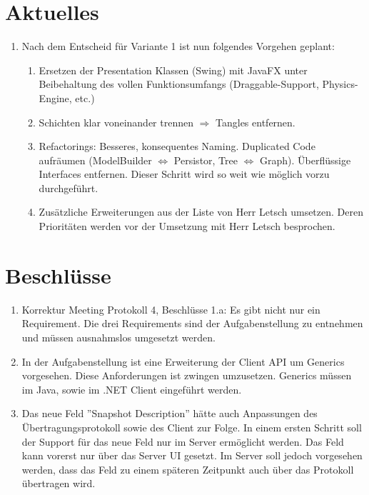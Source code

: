 \documentclass[11pt, a4paper,oneside]{scrartcl}
\begin{document}
\section{Aktuelles}
\begin{enumerate}
	\item Nach dem Entscheid für Variante 1 ist nun folgendes Vorgehen geplant:
	\begin{enumerate}
		\item Ersetzen der Presentation Klassen (Swing) mit JavaFX unter Beibehaltung des vollen Funktionsumfangs (Draggable-Support, Physics-Engine, etc.)
		\item Schichten klar voneinander trennen $\Rightarrow$ Tangles entfernen.
		\item Refactorings: Besseres, konsequentes Naming. Duplicated Code aufräumen (ModelBuilder $\Leftrightarrow$ Persistor, Tree $\Leftrightarrow$ Graph). Überflüssige Interfaces entfernen. Dieser Schritt wird so weit wie möglich vorzu durchgeführt.
		\item Zusätzliche Erweiterungen aus der Liste von Herr Letsch umsetzen. Deren Prioritäten werden vor der Umsetzung mit Herr Letsch besprochen.
	\end{enumerate}
\end{enumerate}

\section{Beschlüsse}
\begin{enumerate}
	\item Korrektur Meeting Protokoll 4, Beschlüsse 1.a: Es gibt nicht nur ein Requirement. Die drei Requirements sind der Aufgabenstellung zu entnehmen und müssen ausnahmslos umgesetzt werden.
	\item In der Aufgabenstellung ist eine Erweiterung der Client API um Generics vorgesehen. Diese Anforderungen ist zwingen umzusetzen. Generics müssen im Java, sowie im .NET Client eingeführt werden.
	\item Das neue Feld ''Snapshot Description'' hätte auch Anpassungen des Übertragungsprotokoll sowie des Client zur Folge. In einem ersten Schritt soll der Support für das neue Feld nur im Server ermöglicht werden. Das Feld kann vorerst nur über das Server UI gesetzt. Im Server soll jedoch vorgesehen werden, dass das Feld zu einem späteren Zeitpunkt auch über das Protokoll übertragen wird.
\end{enumerate}
\end{document}
